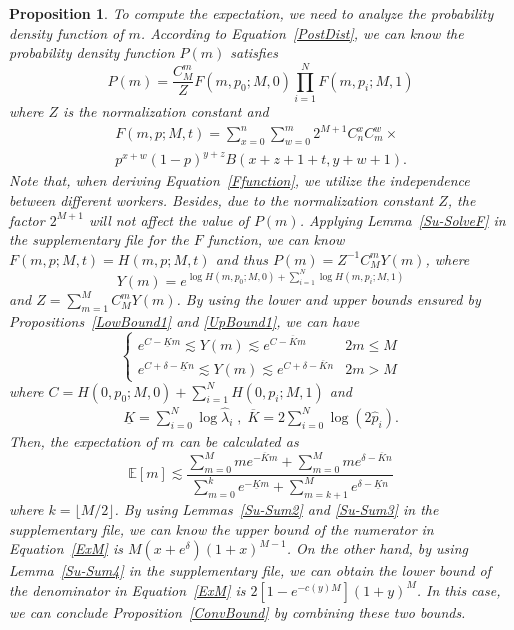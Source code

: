 \documentclass{article}
\makeatletter
\newtheorem{proposition}[theorem]{Proposition}
\renewenvironment{proof}[1][\proofname]{\par
  \vspace{-\topsep}%
  \pushQED{\qed}%
  \normalfont
  \topsep0pt \partopsep0pt %
  \trivlist
  \item[\hskip\labelsep
        \itshape
    #1\@addpunct{.}]\ignorespaces
}{%
  \popQED\endtrivlist\@endpefalse
  \addvspace{0pt plus 0pt} %
}
\makeatother
\begin{document}
\begin{proposition}
\begin{proof}
To compute the expectation, we need to analyze the probability density function of $m$. According to Equation~\ref{PostDist}, we can know the probability density function $P(m)$ satisfies
\begin{equation}
\label{PDist}
P(m) = \frac{C_{M}^{m}}{Z}F(m, p_0; M, 0)\prod_{i=1}^{N}F(m, p_i; M, 1)
\end{equation}
where $Z$ is the normalization constant and
\begin{equation}
\label{Ffunction}
\begin{split}
F(m,p;M,t)={\sum}_{x=0}^{n}{\sum}_{w=0}^{m} 2^{M+1}C_{n}^{x}C_{m}^{w}\times\\
p^{x+w}(1-p)^{y+z}B(x+z+1+t,y+w+1).
\end{split}
\end{equation}
Note that, when deriving Equation~\ref{Ffunction}, we utilize the independence between different workers. Besides, due to the normalization constant $Z$, the factor $2^{M+1}$ will not affect the value of $P(m)$.
Applying Lemma~\ref{Su-SolveF} in the supplementary file for the $F$ function, we can know
$F(m,p;M,t) = H(m,p;M,t)$ and thus $P(m)=Z^{-1}C_{M}^{m}Y(m)$, where
\begin{equation}
\label{PDist}
Y(m) =e^{\log H(m,p_0;M,0)+\sum_{i=1}^{N}\log H(m,p_i;M,1)}
\end{equation}
and $Z=\sum_{m=1}^{M}C_{M}^{m}Y(m)$. 
By using the lower and upper bounds ensured by Propositions~\ref{LowBound1} and \ref{UpBound1}, we can have
\begin{equation}
\left\{
\begin{array}{lc}
e^{C-\underline{K}m}\lesssim Y(m) \lesssim e^{C-\overline{K}m} & 2m\leq M\\
e^{C+\delta-\underline{K}n}\lesssim Y(m) \lesssim e^{C+\delta-\overline{K}n} & 2m>M
\end{array}
\right.
\end{equation}
where $C=H(0,p_0;M,0)+\sum_{i=1}^{N}H(0,p_i;M,1)$ and
\begin{equation*}
\begin{split}
\underline{K} = {\sum}_{i=0}^{N}\log \hat{\lambda}_{i}\;,\; \overline{K} =  2{\sum}_{i=0}^{N}\log \left(2\hat{p}_i\right).
\end{split}
\end{equation*}
Then, the expectation of $m$ can be calculated as
\begin{equation}
\label{ExM}
\mathbb{E}[m] \lesssim \frac{\sum_{m=0}^{M}me^{-\overline{K}m}+\sum_{m=0}^{M}me^{\delta-\overline{K}n}}{\sum_{m=0}^{k}e^{-\underline{K}m}+\sum_{m=k+1}^{M}e^{\delta-\underline{K}n}}
\end{equation}
where $k=\lfloor M/2 \rfloor$. By using Lemmas~\ref{Su-Sum2} and \ref{Su-Sum3} in the supplementary file, we can know the upper bound of the numerator in Equation~\ref{ExM} is $M(x+e^{\delta})(1+x)^{M-1}$. On the other hand, by using Lemma~\ref{Su-Sum4} in the supplementary file, we can obtain the lower bound of the denominator in Equation~\ref{ExM} is $2[1-e^{-c(y)M}](1+y)^{M}$. In this case, we can conclude Proposition~\ref{ConvBound} by combining these two bounds.


\end{proof}
\end{proposition}
\end{document}
